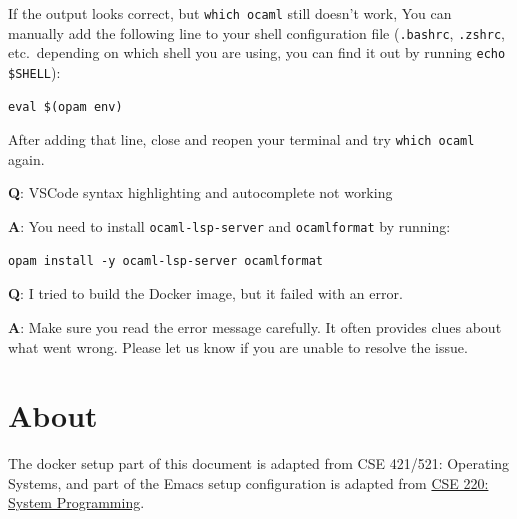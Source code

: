 \documentclass{extarticle}
\begin{document}
If the output looks correct, but \texttt{which ocaml} still doesn't work,
You can manually add the following line to your shell configuration file
(\texttt{.bashrc}, \texttt{.zshrc}, etc.\ depending on which shell you are using,
you can find it out by running \texttt{echo \$SHELL}):
\begin{lstlisting}
eval $(opam env)
\end{lstlisting}
After adding that line, close and reopen your terminal and try \texttt{which ocaml} again.

\textbf{Q}: VSCode syntax highlighting and autocomplete not working

\textbf{A}: You need to install \texttt{ocaml-lsp-server} and \texttt{ocamlformat} by running:
\begin{lstlisting}
opam install -y ocaml-lsp-server ocamlformat
\end{lstlisting}

\textbf{Q}: I tried to build the Docker image, but it failed with an error.

\textbf{A}: Make sure you read the error message carefully.
It often provides clues about what went wrong.
Please let us know if you are unable to resolve the issue.

\newpage
\section{About}
The docker setup part of this document is adapted from CSE 421/521: Operating Systems,
and part of the Emacs setup configuration is adapted from \href{https://github.com/ub-cse220/emacs-config}{CSE 220: System Programming}.
\end{document}
